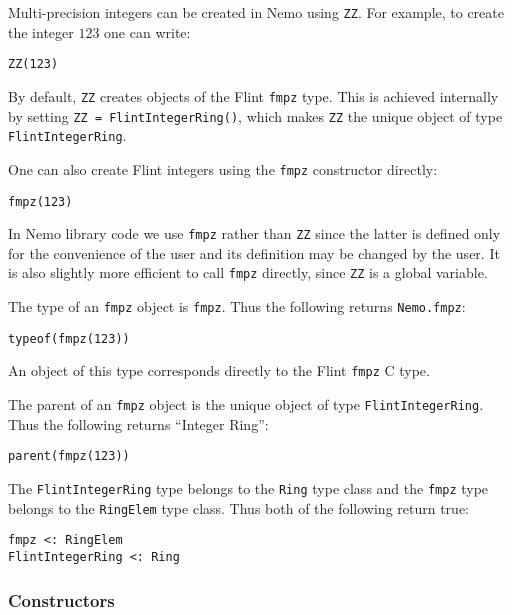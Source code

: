 \documentclass[a4paper,10pt]{article}
\newcommand{\code}{\lstinline}
\begin{document}
Multi-precision integers can be created in Nemo using \code{ZZ}. For example, to create the integer
$123$ one can write:

\begin{lstlisting}
ZZ(123)
\end{lstlisting}

By default, \code{ZZ} creates objects of the Flint \code{fmpz} type. This is achieved internally by
setting \code{ZZ = FlintIntegerRing()}, which makes \code{ZZ} the unique object of type
\code{FlintIntegerRing}.

One can also create Flint integers using the \code{fmpz} constructor directly:

\begin{lstlisting}
fmpz(123)
\end{lstlisting}

In Nemo library code we use \code{fmpz} rather than \code{ZZ} since the latter is defined only for the
convenience of the user and its definition may be changed by the user. It is also slightly more
efficient to call \code{fmpz} directly, since \code{ZZ} is a global variable.

The type of an \code{fmpz} object is \code{fmpz}. Thus the following returns \code{Nemo.fmpz}:

\begin{lstlisting}
typeof(fmpz(123))
\end{lstlisting}

An object of this type corresponds directly to the Flint \code{fmpz} C type.

The parent of an \code{fmpz} object is the unique object of type \code{FlintIntegerRing}. Thus the
following returns ``Integer Ring'':

\begin{lstlisting}
parent(fmpz(123))
\end{lstlisting}

The \code{FlintIntegerRing} type belongs to the \code{Ring} type class and the \code{fmpz} type
belongs to the \code{RingElem} type class. Thus both of the following return true:

\begin{lstlisting}
fmpz <: RingElem
FlintIntegerRing <: Ring
\end{lstlisting}

\subsubsection{Constructors}
\end{document}
